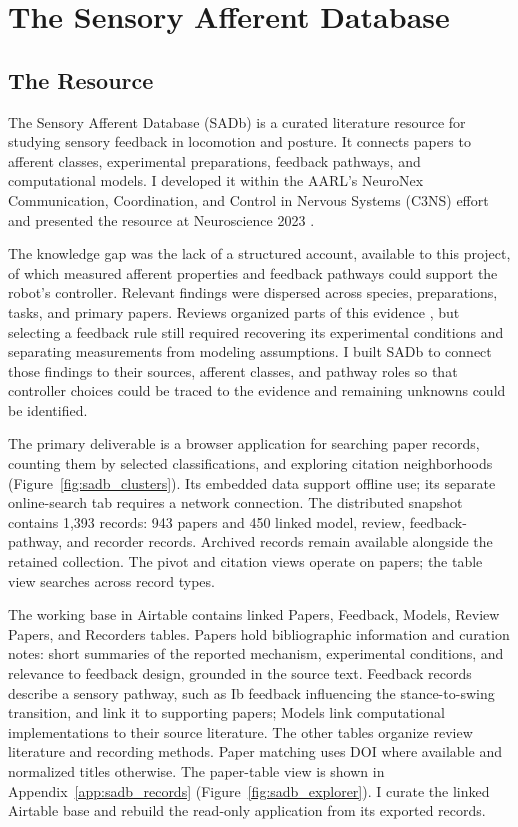 \chapter{The Sensory Afferent Database}\label{ch:database}
\graphicspath{{figs/50-database/}}

\section{The Resource}\label{sec:sadb_resource}

The Sensory Afferent Database (SADb) is a curated literature resource for studying sensory feedback in locomotion and posture. It connects papers to afferent classes, experimental preparations, feedback pathways, and computational models. I developed it within the AARL's NeuroNex Communication, Coordination, and Control in Nervous Systems (C3NS) effort and presented the resource at Neuroscience 2023 \citep{bolen_sensory_2023}.

The knowledge gap was the lack of a structured account, available to this project, of which measured afferent properties and feedback pathways could support the robot's controller. Relevant findings were dispersed across species, preparations, tasks, and primary papers. Reviews organized parts of this evidence \citep{van_de_crommert_review_1998, windhorst_muscle_2007, windhorst_spinal_2022}, but selecting a feedback rule still required recovering its experimental conditions and separating measurements from modeling assumptions. I built SADb to connect those findings to their sources, afferent classes, and pathway roles so that controller choices could be traced to the evidence and remaining unknowns could be identified.

The primary deliverable is a browser application for searching paper records, counting them by selected classifications, and exploring citation neighborhoods (Figure~\ref{fig:sadb_clusters}). Its embedded data support offline use; its separate online-search tab requires a network connection. The distributed snapshot contains 1,393 records: 943 papers and 450 linked model, review, feedback-pathway, and recorder records. Archived records remain available alongside the retained collection. The pivot and citation views operate on papers; the table view searches across record types.

The working base in Airtable contains linked Papers, Feedback, Models, Review Papers, and Recorders tables. Papers hold bibliographic information and curation notes: short summaries of the reported mechanism, experimental conditions, and relevance to feedback design, grounded in the source text. Feedback records describe a sensory pathway, such as Ib feedback influencing the stance-to-swing transition, and link it to supporting papers; Models link computational implementations to their source literature. The other tables organize review literature and recording methods. Paper matching uses DOI where available and normalized titles otherwise. The paper-table view is shown in Appendix~\ref{app:sadb_records} (Figure~\ref{fig:sadb_explorer}). I curate the linked Airtable base and rebuild the read-only application from its exported records.

